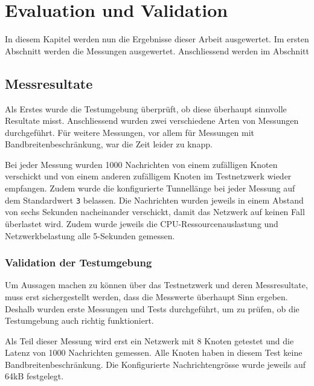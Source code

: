\chapter{Evaluation und Validation}
\label{ch:evaluation}


In diesem Kapitel werden nun die Ergebnisse dieser Arbeit ausgewertet.
Im ersten Abschnitt  werden die Messungen
ausgewertet.
Anschliessend werden im Abschnitt 

\section{Messresultate}\label{sec:messresultate}

Als Erstes wurde die Testumgebung überprüft, ob diese überhaupt sinnvolle Resultate misst.
Anschliessend wurden zwei verschiedene Arten von Messungen durchgeführt.
Für weitere Messungen, vor allem für Messungen mit Bandbreitenbeschränkung, war die Zeit leider zu knapp.

Bei jeder Messung wurden 1000 Nachrichten von einem zufälligen Knoten verschickt
und von einem anderen zufälligem Knoten im Testnetzwerk wieder empfangen.
Zudem wurde die konfigurierte Tunnellänge bei jeder Messung auf dem Standardwert \lstinline|3| belassen.
Die Nachrichten wurden jeweils in einem Abstand von sechs Sekunden nacheinander verschickt,
damit das Netzwerk auf keinen Fall überlastet wird.
Zudem wurde jeweils die CPU-Ressourcenauslastung und Netzwerkbelastung alle 5-Sekunden gemessen.

\subsection{Validation der Testumgebung}\label{sec:validation_testumgebung}

Um Aussagen machen zu können über das Testnetzwerk und deren Messresultate, muss erst sichergestellt werden, dass die Messwerte überhaupt Sinn ergeben.
Deshalb wurden erste Messungen und Tests durchgeführt, um zu prüfen, ob die Testumgebung auch richtig funktioniert.

Als Teil dieser Messung wird erst ein Netzwerk mit 8 Knoten getestet und die Latenz von 1000 Nachrichten gemessen.
Alle Knoten haben in diesem Test keine Bandbreitenbeschränkung.
Die Konfigurierte Nachrichtengrösse wurde jeweils auf 64kB festgelegt.

